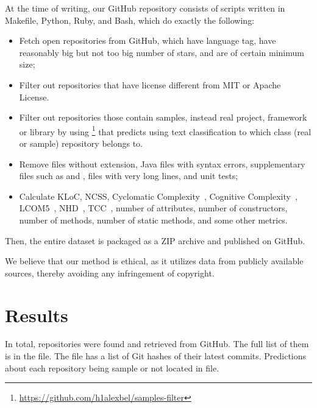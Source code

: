 \documentclass[sigplan,nonacm,review,anonymous]{acmart}
\begin{document}
At the time of writing, our GitHub repository consists of scripts written in Makefile,
Python, Ruby, and Bash, which do exactly the following:
\begin{itemize}
    \item Fetch open repositories from GitHub, which have  language
    tag, have reasonably big but not too big number of stars, and are of certain minimum size;
    \item Filter out repositories that have license different from MIT or Apache License.
    \item Filter out repositories those contain samples, instead real project,
    framework or library by using \footnote{\url{https://github.com/h1alexbel/samples-filter}}
    that predicts using text classification to which class (real or sample)
    repository belongs to.
    \item Remove files without  extension, Java files with syntax errors,
    supplementary files such as  and ,
    files with very long lines, and unit tests;
    \item Calculate KLoC, NCSS, Cyclomatic Complexity~\citep{mccabe1976complexity},
    Cognitive Complexity~\citep{campbell2018cognitive}, LCOM5~\citep{henderson1996coupling},
    NHD~\citep{counsell2006interpretation}, TCC~\citep{bieman1995cohesion},
    number of attributes, number of constructors, number of methods, number of static methods,
    and some other metrics.
\end{itemize}

Then, the entire dataset is packaged as a ZIP archive and published
on GitHub.

We believe that our method is ethical, as it utilizes data from publicly
available sources, thereby avoiding any infringement of copyright.

\section{Results}\label{sec:results}

In total, \unskip{} repositories
were found and retrieved from GitHub.
The full list of them is in the  file.
The  file has a list of Git hashes of their latest commits.
Predictions about each repository being sample or not located in  file.
\end{document}
